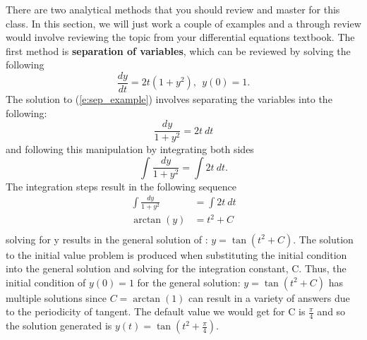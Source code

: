 \documentclass[twoside]{article}
\def\ds{\displaystyle}
\begin{document}
There are two analytical methods that you should review and master for this class. In this section, we will just work a couple of examples and a through review would involve reviewing the topic from your differential equations textbook. The first method is {\bf separation of variables}, which can be reviewed by solving the following
\begin{equation}
\frac {dy}{dt} = 2t(1+y^2), \ \  y(0)=1.
\label{e:sep_example}
\end{equation}
The solution to (\ref{e:sep_example}) involves separating the variables into the following:
$$\frac {dy}{1+y^2} = 2t \ dt$$
and following this manipulation by integrating both sides
$$\int \frac {dy}{1+y^2} = \int 2t \ dt.$$
The integration steps result in the following sequence 
\begin{eqnarray*}
\int \frac {dy}{1+y^2} &= \int 2t \ dt \\
\arctan (y) &= t^2 + C \\
\end{eqnarray*}
solving for y results in the general solution of : $\ds  y = \tan (t^2 + C)$. The solution to the initial value problem is produced when substituting the initial condition into the general solution and solving for the integration constant, C. Thus,  the initial condition of $y(0)=1$ for the general solution: $\ds  y = \tan (t^2 + C)$ has multiple solutions since $\ds C = \arctan(1)$ can result in a variety of answers due to the periodicity of tangent. The default value we would get for C is $\ds \frac {\pi}4$ and so the solution generated is $\ds y(t) = \tan (t^2+\frac {\pi}4)$. 
\end{document}
